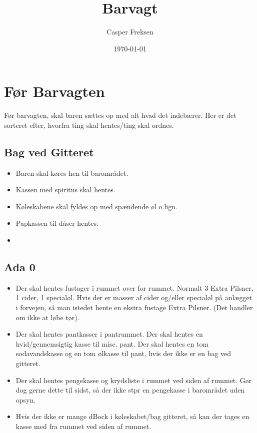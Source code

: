 

\title{Barvagt}
\date{\today}
\author{Casper Freksen}



\maketitle

\section{Før Barvagten}
\label{sec:pre-barvagten}

Før barvagten, skal baren sættes op med alt hvad det indebærer. Her er
det sorteret efter, hvorfra ting skal hentes/ting skal ordnes.

\subsection{Bag ved Gitteret}
\label{sec:pre:bag-ved-gitteret}

\begin{itemize}
\item Baren skal køres hen til barområdet.
\item Kassen med spiritus skal hentes.
\item Køleskabene skal fyldes op med spændende øl
  o.lign. %
\item Papkassen til dåser hentes.
\item %
\end{itemize}

\subsection{Ada 0}
\label{sec:pre:ada}

\begin{itemize}
\item Der skal hentes fustager i rummet over for rummet. Normalt 3
  Extra Pilsner, 1 cider, 1 specialøl. Hvis der er masser af cider
  og/eller specialøl på anlægget i forvejen, så man istedet hente en
  ekstra fustage Extra Pilsner. (Det handler om ikke at løbe tør).
\item Der skal hentes pantkasser i pantrummet. Der skal hentes en
  hvid/gennemsigtig kasse til misc. pant. Der skal hentes en tom
  sodavandskasse og en tom ølkasse til pant, hvis der ikke er en bag
  ved gitteret.
\item Der skal hentes pengekasse og krydsliste i rummet ved siden af
  rummet. Gør dog gerne dette til sidst, så der ikke stpr en
  pengekasse i barområdet uden opsyn.
\item Hvis der ikke er mange dBock\texttrademark{} i køleskabet/bag gitteret, så kan
  der tages en kasse med fra rummet ved siden af rummet.
\end{itemize}


